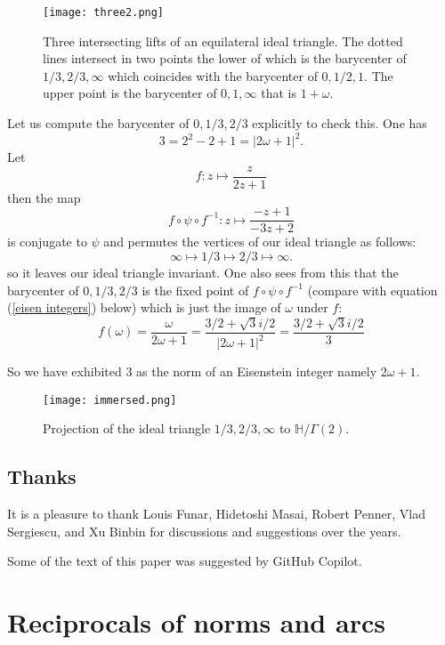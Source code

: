 \documentclass[12pt]{amsart}
\theoremstyle{plain}
\theoremstyle{definition}
\def\HH{\mathbb{H}}
\def\xx{\HH/g2}
\def\g2{\Gamma(2)}
\def\xx{\HH/\g2}
\begin{document}
  \begin{figure}[hb]
\begin{center}
\texttt{[image: three2.png]} 
\end{center}
\caption{Three intersecting  lifts  of an equilateral ideal triangle.
The dotted lines intersect in two points the lower of which 
is the barycenter of $1/3, 2/3,\infty$
which coincides with the barycenter of $0, 1/2,1$.
The upper point is the barycenter of $0,1,\infty$
that is $1+\omega$.}
\end{figure}
Let us compute the barycenter of $0,1/3,2/3$ explicitly to check this. 
One has
$$3 = 2^2 - 2 + 1 = | 2\omega + 1 |^2.$$
Let
$$f :  z \mapsto \frac{z}{2z+1}$$
then the map
$$ f \circ \psi \circ f^{-1} :  z \mapsto \frac{-z+ 1}{-3z+2}$$
is conjugate to $\psi$ and permutes the vertices of our ideal
triangle as follows:
$$ \infty \mapsto 1/3 \mapsto 2/3 \mapsto \infty.$$
so it leaves our ideal triangle invariant.
One also sees from this that the barycenter of $0,1/3,2/3$
is the fixed point of $f \circ \psi \circ f^{-1}$ 
(compare with equation (\ref{eisen integers}) below)
which is just the image of $\omega$ under $f$:
$$ f(\omega) = \frac{\omega}{2\omega+1} 
= \frac{3/ 2+ \sqrt{3}i/2 }{|2 \omega + 1 |^2}
= \frac{3/ 2+ \sqrt{3}i/2 }{3}
$$

So we have exhibited $3$ as the norm of an Eisenstein integer namely
$2\omega + 1$. 


\begin{figure}[ht]
\begin{center}
\texttt{[image: immersed.png]} 
\end{center}
\caption{Projection of  the ideal triangle $1/3, 2/3,\infty$
to $\xx$.}
	\label{immersed triangle}
\end{figure}

 
\subsection{Thanks}

It is a pleasure to thank Louis Funar, Hidetoshi Masai, Robert
Penner, Vlad Sergiescu, and Xu Binbin for discussions and
suggestions over the years.

Some of the text of this paper was suggested by GitHub
Copilot\cite{copilot, vim_copilot}.

\section{Reciprocals of norms and arcs}
\end{document}

